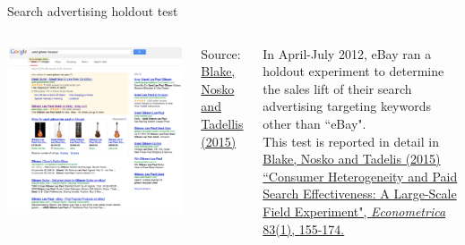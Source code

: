 \documentclass[10pt, aspectratio=169]{beamer}
\newcommand{\source}[1]{\begin{flushright} \footnotesize Source: {#1} \end{flushright} \normalsize}
\begin{document}
\begin{frame}{Search advertising holdout test}
\begin{columns}
\includegraphics[height=0.8\textheight]{images/lespaul.png}
\source{\href{https://drive.google.com/uc?export=download&id=0B0EzanlzLNsWU1BkWnFxZlZuZUE}{Blake, Nosko and Tadellis (2015)}}
In April-July 2012, eBay ran a holdout experiment to determine the sales lift of their search advertising targeting keywords other than ``eBay". \\
\bigskip
This test is reported in detail in \href{https://github.com/eleafeit/ad_response_tutorial/blob/master/Papers/BlakeNoskoTadelis2015ConsumerHeterogeneityandPaidSearchEffectiveness.pdf}{Blake, Nosko and Tadelis (2015) ``Consumer Heterogeneity and Paid Search Effectiveness: A Large-Scale Field Experiment", \textit{Econometrica} 83(1), 155-174.}
\end{columns}
\end{frame}
\end{document}
